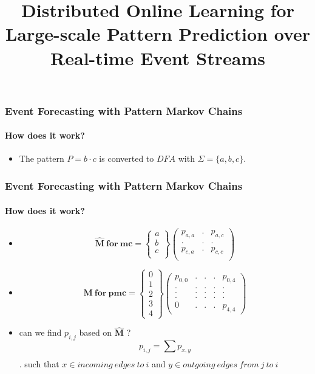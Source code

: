 \documentclass{beamer}
\title{	Distributed Online Learning for Large-scale Pattern Prediction over Real-time Event Streams}
\begin{document}
\frame
{
	\frametitle{Event Forecasting with Pattern Markov
		Chains  }
	\framesubtitle{ How does it work?}
	\begin{itemize}
		\item<only@1> The pattern \boldmath$P=b\cdot c$ is converted to $DFA$ with $\Sigma=\{a,b,c\}$. 
		
		
	\end{itemize}
}



\frame
{
	\frametitle{Event Forecasting with Pattern Markov
		Chains}
	\framesubtitle{How does it work?}
	\begin{itemize}
		\item<only@1> \begin{equation*}
		\label{eq:matrix_example}
		\boldsymbol{\hat{M}\ for\ mc} = 
		\begin{Bmatrix} 
		a \\ b \\ c \\
		\end{Bmatrix}
		\begin{pmatrix} 
		p_{a,a}	    &. 	&  	p_{a,c} \\
		.	        &. 	&  	.       \\
		p_{c,a}	    &. 	&  	p_{c,c} \\
		\end{pmatrix}
		\end{equation*}
		
		\item<only@1> 
		\begin{equation*}
		\label{eq:matrix_example}
		\boldsymbol{M\ for\ pmc} = 
		\begin{Bmatrix} 
		0 \\ 1 \\ 2 \\ 3 \\4
		\end{Bmatrix}
		\begin{pmatrix} 
		p_{0,0}	    &. 		&. 		& . &  	p_{0,4} \\
		. 		    & .		& .	& .	& . \\
		.		    & .		& .		& .	& . \\
		.			& .		& .		& .	& .\\
		0			& .			& .		& .	&p_{4,4}
		\end{pmatrix}
		\end{equation*}
		
		\item<only@1> can we find $p_{i,j}$  based on $\boldsymbol{\hat{M}}$ ? 
		\begin{equation}
		\label{eq:pi_estim}
		p_{i,j}=\sum_{} p_{x,y}
		\end{equation}.
		such that $x \in incoming\ edges\ to\ i$ 	and  $y \in outgoing\ edges\ from\ j\ to\ i$
		
	\end{itemize}
}
\end{document}

